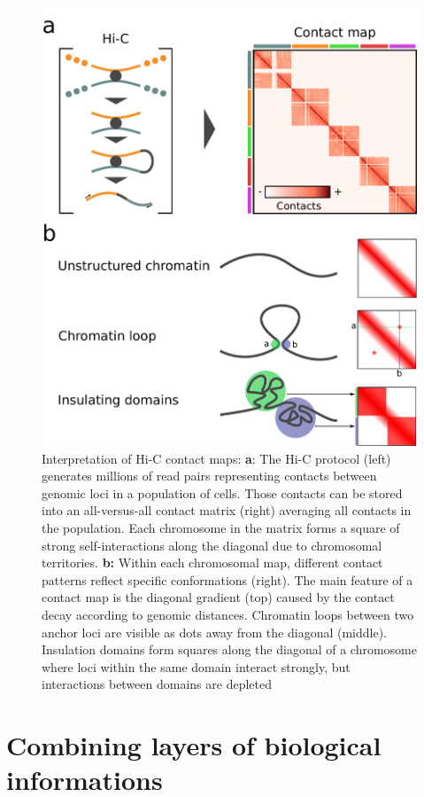\begin{figure}[b]
    \includegraphics[width=\textwidth]{Parts/Part01/gfx/hic_interpretation.pdf}
    \caption{Interpretation of Hi-C contact maps: \textbf{a}: The Hi-C protocol (left) generates millions of read pairs representing contacts between genomic loci in a population of cells. Those contacts can be stored into an all-versus-all contact matrix (right) averaging all contacts in the population. Each chromosome in the matrix forms a square of strong self-interactions along the diagonal due to chromosomal territories. \textbf{b:} Within each chromosomal map, different contact patterns reflect specific conformations (right). The main feature of a contact map is the diagonal gradient (top) caused by the contact decay according to genomic distances. Chromatin loops between two anchor loci are visible as dots away from the diagonal (middle). Insulation domains form squares along the diagonal of a chromosome where loci within the same domain interact strongly, but interactions between domains are depleted}
	\label{fig:01-02:hic}
\end{figure}

\section{Combining layers of biological informations}


